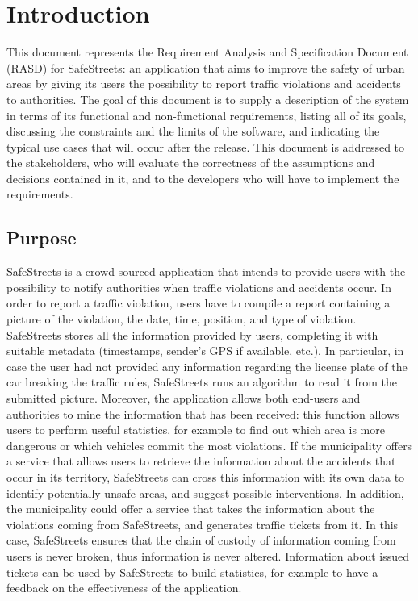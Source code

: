 \documentclass{report}
\begin{document}

\tableofcontents
\chapter{Introduction}
This document represents the Requirement Analysis and Specification Document (RASD) for SafeStreets: an application that aims to improve the safety of urban areas by giving its users the possibility to report traffic violations and accidents to authorities. The goal of this document is to supply a description of the system in terms of its functional and non-functional requirements, listing all of its goals, discussing the constraints and the limits of the software, and indicating the typical use cases that will occur after the release. This document is addressed to the stakeholders, who will evaluate the correctness of the assumptions and decisions contained in it, and to the developers who will have to implement the requirements.
\section{Purpose}
SafeStreets is a crowd-sourced application that intends to provide users with the possibility to notify authorities when traffic violations and accidents occur. In order to report a traffic violation, users have to compile a report containing a picture of the violation, the date, time, position, and type of violation. SafeStreets stores all the information provided by users, completing it with suitable metadata (timestamps, sender's GPS if available, etc.). In particular, in case the user had not provided any information regarding the license plate of the car breaking the traffic rules, SafeStreets runs an algorithm to read it from the submitted picture. Moreover, the application allows both end-users and authorities to mine the information that has been received: this function allows users to perform useful statistics, for example to find out which area is more dangerous or which vehicles commit the most violations. If the municipality offers a service that allows users to retrieve the information about the accidents that occur in its territory, SafeStreets can cross this information with its own data to identify potentially unsafe areas, and suggest possible interventions.
In addition, the municipality could offer a service that takes the information about the violations coming from SafeStreets, and generates traffic tickets from it. In this case, SafeStreets ensures that the chain of custody of information coming from users is never broken, thus information is never altered. Information about issued tickets can be used by SafeStreets to build statistics, for example to have a feedback on the effectiveness of the application.
\end{document}

